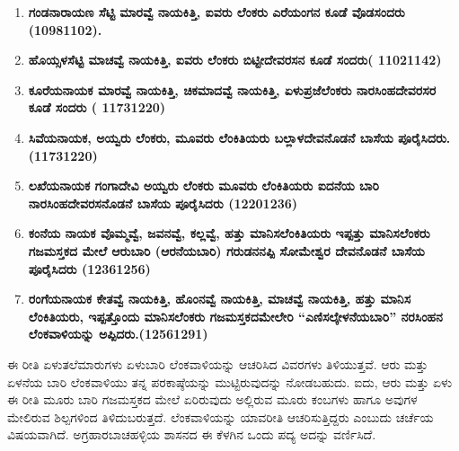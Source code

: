 \begin{enumerate}
\item \textbf{ಗಂಡನಾರಾಯಣ ಸೆಟ್ಟಿ  ಮಾರವ್ವೆ ನಾಯಕಿತ್ತಿ, ಐವರು ಲೆಂಕರು ಎರೆಯಂಗನ ಕೂಡೆ ವೊಡಸಂದರು (10981102).}

 \item \textbf{ಹೊಯ್ಸಳಸೆಟ್ಟಿ  ಮಾಚವ್ವೆ ನಾಯಕಿತ್ತಿ, ಐವರು ಲೆಂಕರು ಬಿಟ್ಟೀದೇವರಸನ ಕೂಡೆ ಸಂದರು( 11021142)}

 \item \textbf{ಕೂರೆಯನಾಯಕ  ಮಾರವ್ವೆ ನಾಯಕಿತ್ತಿ, ಚಿಕಮಾದವ್ವೆ ನಾಯಕಿತ್ತಿ, ಏಳುಪ್ರಜೆಲೆಂಕರು ನಾರಸಿಂಹದೇವರಸರ ಕೂಡೆ ಸಂದರು ( 11731220)}

 \item \textbf{ಸಿವೆಯನಾಯಕ, ಅಯ್ವರು ಲೆಂಕರು, ಮೂವರು ಲೆಂಕಿತಿಯರು ಬಲ್ಲಾಳದೇವನೊಡನೆ ಬಾಸೆಯ ಪೂರೈಸಿದರು. (11731220)}

 \item \textbf{ಲಖೆಯನಾಯಕ  ಗಂಗಾದೇವಿ ಅಯ್ವರು ಲೆಂಕರು ಮೂವರು ಲೆಂಕಿತಿಯರು ಐದನೆಯ ಬಾರಿ ನಾರಸಿಂಹದೇವರಸನೊಡನೆ ಬಾಸೆಯ ಪೂರೈಸಿದರು (12201236)}

 \item \textbf{ಕಂನೆಯ ನಾಯಕ  ವೊಮ್ಮವ್ವೆ, ಜವನವ್ವೆ, ಕಲ್ಲವ್ವೆ, ಹತ್ತು ಮಾನಿಸಲೆಂಕಿತಿಯರು ಇಪ್ಪತ್ತು ಮಾನಿಸಲೆಂಕರು ಗಜಮಸ್ತಕದ ಮೇಲೆ ಆರುಬಾರಿ (ಆರನೆಯಬಾರಿ) ಗರುಡನನಪ್ಪಿ ಸೋಮೇಶ್ವರ ದೇವನೊಡನೆ ಬಾಸೆಯ ಪೂರೈಸಿದರು (12361256)}

 \item \textbf{ರಂಗೆಯನಾಯಕ  ಕೇತವ್ವೆ ನಾಯಕಿತ್ತಿ, ಹೊಂನವ್ವೆ ನಾಯಕಿತ್ತಿ, ಮಾಚವ್ವೆ ನಾಯಕಿತ್ತಿ, ಹತ್ತು ಮಾನಿಸ ಲೆಂಕಿತಿಯರು, ಇಪ್ಪತ್ತೊಂದು ಮಾನಿಸಲೆಂಕರು ಗಜಮಸ್ತಕದಮೇಲೇರಿ “ಎಣಿಸಲ್ಕೇಳನೆಯಬಾರಿ” ನರಸಿಂಹನ ಲೆಂಕವಾಳಿಯನ್ನು\general{\break } ಅಪ್ಪಿದರು.(12561291)}

\end{enumerate}

ಈ ರೀತಿ ಏಳುತಲೆಮಾರುಗಳು ಏಳುಬಾರಿ ಲೆಂಕವಾಳಿಯನ್ನು ಆಚರಿಸಿದ ವಿವರಗಳು ತಿಳಿಯುತ್ತವೆ. ಆರು ಮತ್ತು ಏಳನೆಯ ಬಾರಿ ಲೆಂಕವಾಳಿಯು ತನ್ನ ಪರಕಾಷ್ಠೆಯನ್ನು ಮುಟ್ಟಿರುವುದನ್ನು ನೋಡಬಹುದು. ಐದು, ಆರು ಮತ್ತು ಏಳು ಈ ರೀತಿ ಮೂರು ಬಾರಿ ಗಜಮಸ್ತಕದ ಮೇಲೆ ಏರಿರುವುದು ಅಲ್ಲಿರುವ ಮೂರು ಕಂಬಗಳು ಹಾಗೂ ಅವುಗಳ ಮೇಲಿರುವ ಶಿಲ್ಪಗಳಿಂದ ತಿಳಿದುಬರುತ್ತದೆ. ಲೆಂಕವಾಳಿಯನ್ನು ಯಾವರೀತಿ ಆಚರಿಸುತ್ತಿದ್ದರು ಎಂಬುದು ಚರ್ಚೆಯ ವಿಷಯವಾಗಿದೆ. ಅಗ್ರಹಾರಬಾಚಹಳ್ಳಿಯ ಶಾಸನದ ಈ ಕೆಳಗಿನ ಒಂದು ಪದ್ಯ ಅದನ್ನು ವರ್ಣಿಸಿದೆ.

